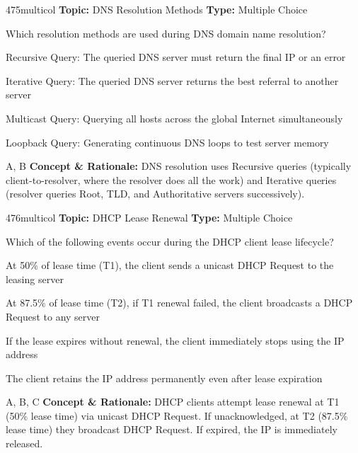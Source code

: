 \begin{qcard}{475}{multicol}
\textcolor{darkslate!75}{\small\textbf{Topic:} DNS Resolution Methods \hfill \textbf{Type:} Multiple Choice}\vspace{0.4em}\par
Which resolution methods are used during DNS domain name resolution?
\begin{qoptions}
\item Recursive Query: The queried DNS server must return the final IP or an error
\item Iterative Query: The queried DNS server returns the best referral to another server
\item Multicast Query: Querying all hosts across the global Internet simultaneously
\item Loopback Query: Generating continuous DNS loops to test server memory
\end{qoptions}
\end{qcard}
\nopagebreak
\begin{explainbox}{A, B}
\textbf{Concept \& Rationale:} DNS resolution uses Recursive queries (typically client-to-resolver, where the resolver does all the work) and Iterative queries (resolver queries Root, TLD, and Authoritative servers successively).
\end{explainbox}

\begin{qcard}{476}{multicol}
\textcolor{darkslate!75}{\small\textbf{Topic:} DHCP Lease Renewal \hfill \textbf{Type:} Multiple Choice}\vspace{0.4em}\par
Which of the following events occur during the DHCP client lease lifecycle?
\begin{qoptions}
\item At 50\% of lease time (T1), the client sends a unicast DHCP Request to the leasing server
\item At 87.5\% of lease time (T2), if T1 renewal failed, the client broadcasts a DHCP Request to any server
\item If the lease expires without renewal, the client immediately stops using the IP address
\item The client retains the IP address permanently even after lease expiration
\end{qoptions}
\end{qcard}
\nopagebreak
\begin{explainbox}{A, B, C}
\textbf{Concept \& Rationale:} DHCP clients attempt lease renewal at T1 (50\% lease time) via unicast DHCP Request. If unacknowledged, at T2 (87.5\% lease time) they broadcast DHCP Request. If expired, the IP is immediately released.
\end{explainbox}


